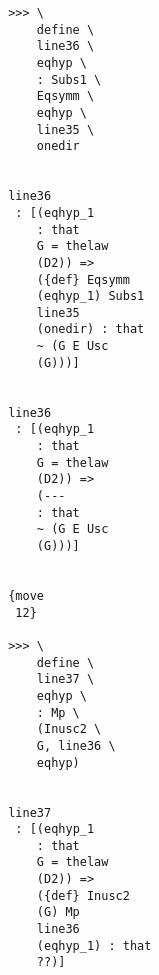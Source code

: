 \documentclass[12pt]{article}
\begin{document}
\begin{verbatim}
                                       >>> \
                                           define \
                                           line36 \
                                           eqhyp \
                                           : Subs1 \
                                           Eqsymm \
                                           eqhyp \
                                           line35 \
                                           onedir


                                       line36 
                                        : [(eqhyp_1 
                                           : that 
                                           G = thelaw 
                                           (D2)) => 
                                           ({def} Eqsymm 
                                           (eqhyp_1) Subs1 
                                           line35 
                                           (onedir) : that 
                                           ~ (G E Usc 
                                           (G)))]


                                       line36 
                                        : [(eqhyp_1 
                                           : that 
                                           G = thelaw 
                                           (D2)) => 
                                           (--- 
                                           : that 
                                           ~ (G E Usc 
                                           (G)))]


                                       {move 
                                        12}

                                       >>> \
                                           define \
                                           line37 \
                                           eqhyp \
                                           : Mp \
                                           (Inusc2 \
                                           G, line36 \
                                           eqhyp)


                                       line37 
                                        : [(eqhyp_1 
                                           : that 
                                           G = thelaw 
                                           (D2)) => 
                                           ({def} Inusc2 
                                           (G) Mp 
                                           line36 
                                           (eqhyp_1) : that 
                                           ??)]



\end{verbatim}
\end{document}
